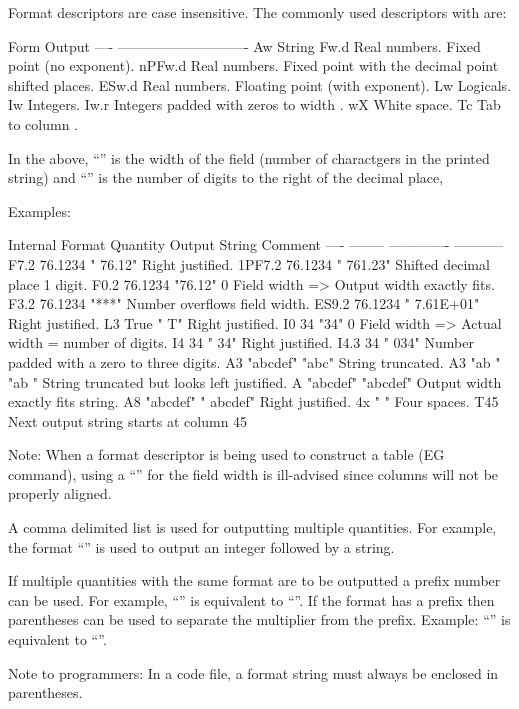 Format descriptors are case insensitive. The commonly used descriptors with \tao are:
\begin{example}
  Form     Output
  ----     ----------------------------
  Aw       String
  Fw.d     Real numbers. Fixed point (no exponent).
  nPFw.d   Real numbers. Fixed point with the decimal point shifted  places.
  ESw.d    Real numbers. Floating point (with exponent).
  Lw       Logicals.
  Iw       Integers.
  Iw.r     Integers padded with zeros to width .
  wX       White space.
  Tc       Tab to column .
\end{example}
In the above, ``'' is the width of the field (number of charactgers in the printed string) and 
``'' is the number of digits to the right of the decimal place, 

Examples:
\begin{example}
           Internal
  Format   Quantity   Output String   Comment
  ----     --------   -------------   -----------
  F7.2     76.1234    "  76.12"       Right justified.
  1PF7.2   76.1234    " 761.23"       Shifted decimal place 1 digit.
  F0.2     76.1234    "76.12"         0 Field width => Output width exactly fits.
  F3.2     76.1234    "***"           Number overflows field width.
  ES9.2    76.1234    " 7.61E+01"     Right justified.
  L3       True       "  T"           Right justified.
  I0       34         "34"            0 Field width => Actual width = number of digits.
  I4       34         "  34"          Right justified.
  I4.3     34         " 034"          Number padded with a zero to three digits.
  A3       "abcdef"   "abc"           String truncated.
  A3       "ab    "   "ab "           String truncated but looks left justified.
  A        "abcdef"   "abcdef"        Output width exactly fits string.
  A8       "abcdef"   "  abcdef"      Right justified.
  4x                  "   "           Four spaces.
  T45                                 Next output string starts at column 45
\end{example}

Note: When a format descriptor is being used to construct a table (EG  command),
using a ``'' for the field width is ill-advised since columns will not be properly aligned.

A comma delimited list is used for outputting multiple quantities. For example, the format ``'' is used to output an integer followed by a string.

If multiple quantities with the same format are to be outputted a  prefix number can
be used. For example, ``'' is equivalent to ``''. If the format has a 
prefix then parentheses can be used to separate the multiplier from the  prefix. Example:
``'' is equivalent to ``''.

Note to programmers: In a code file, a format string must always be enclosed in parentheses.
